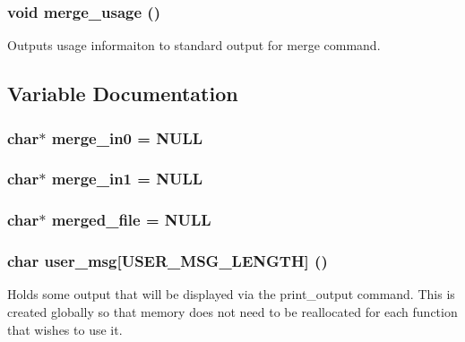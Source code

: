 \subsubsection{\setlength{\rightskip}{0pt plus 5cm}void merge\_\-usage ()}\label{merge_8c_a4}


Outputs usage informaiton to standard output for merge command. 

\subsection{Variable Documentation}
\subsubsection{\setlength{\rightskip}{0pt plus 5cm}char$\ast$ merge\_\-in0 = NULL}\label{merge_8c_a1}


\subsubsection{\setlength{\rightskip}{0pt plus 5cm}char$\ast$ merge\_\-in1 = NULL}\label{merge_8c_a2}


\subsubsection{\setlength{\rightskip}{0pt plus 5cm}char$\ast$ merged\_\-file = NULL}\label{merge_8c_a0}


\subsubsection{\setlength{\rightskip}{0pt plus 5cm}char user\_\-msg[USER\_\-MSG\_\-LENGTH] ()}\label{merge_8c_a3}


Holds some output that will be displayed via the print\_\-output command. This is created globally so that memory does not need to be reallocated for each function that wishes to use it. 